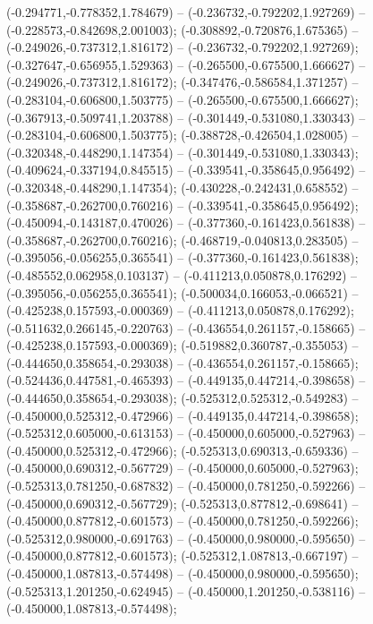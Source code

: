  (-0.294771,-0.778352,1.784679) -- (-0.236732,-0.792202,1.927269) -- (-0.228573,-0.842698,2.001003);
 (-0.308892,-0.720876,1.675365) -- (-0.249026,-0.737312,1.816172) -- (-0.236732,-0.792202,1.927269);
 (-0.327647,-0.656955,1.529363) -- (-0.265500,-0.675500,1.666627) -- (-0.249026,-0.737312,1.816172);
 (-0.347476,-0.586584,1.371257) -- (-0.283104,-0.606800,1.503775) -- (-0.265500,-0.675500,1.666627);
 (-0.367913,-0.509741,1.203788) -- (-0.301449,-0.531080,1.330343) -- (-0.283104,-0.606800,1.503775);
 (-0.388728,-0.426504,1.028005) -- (-0.320348,-0.448290,1.147354) -- (-0.301449,-0.531080,1.330343);
 (-0.409624,-0.337194,0.845515) -- (-0.339541,-0.358645,0.956492) -- (-0.320348,-0.448290,1.147354);
 (-0.430228,-0.242431,0.658552) -- (-0.358687,-0.262700,0.760216) -- (-0.339541,-0.358645,0.956492);
 (-0.450094,-0.143187,0.470026) -- (-0.377360,-0.161423,0.561838) -- (-0.358687,-0.262700,0.760216);
 (-0.468719,-0.040813,0.283505) -- (-0.395056,-0.056255,0.365541) -- (-0.377360,-0.161423,0.561838);
 (-0.485552,0.062958,0.103137) -- (-0.411213,0.050878,0.176292) -- (-0.395056,-0.056255,0.365541);
 (-0.500034,0.166053,-0.066521) -- (-0.425238,0.157593,-0.000369) -- (-0.411213,0.050878,0.176292);
 (-0.511632,0.266145,-0.220763) -- (-0.436554,0.261157,-0.158665) -- (-0.425238,0.157593,-0.000369);
 (-0.519882,0.360787,-0.355053) -- (-0.444650,0.358654,-0.293038) -- (-0.436554,0.261157,-0.158665);
 (-0.524436,0.447581,-0.465393) -- (-0.449135,0.447214,-0.398658) -- (-0.444650,0.358654,-0.293038);
 (-0.525312,0.525312,-0.549283) -- (-0.450000,0.525312,-0.472966) -- (-0.449135,0.447214,-0.398658);
 (-0.525312,0.605000,-0.613153) -- (-0.450000,0.605000,-0.527963) -- (-0.450000,0.525312,-0.472966);
 (-0.525313,0.690313,-0.659336) -- (-0.450000,0.690312,-0.567729) -- (-0.450000,0.605000,-0.527963);
 (-0.525313,0.781250,-0.687832) -- (-0.450000,0.781250,-0.592266) -- (-0.450000,0.690312,-0.567729);
 (-0.525313,0.877812,-0.698641) -- (-0.450000,0.877812,-0.601573) -- (-0.450000,0.781250,-0.592266);
 (-0.525312,0.980000,-0.691763) -- (-0.450000,0.980000,-0.595650) -- (-0.450000,0.877812,-0.601573);
 (-0.525312,1.087813,-0.667197) -- (-0.450000,1.087813,-0.574498) -- (-0.450000,0.980000,-0.595650);
 (-0.525313,1.201250,-0.624945) -- (-0.450000,1.201250,-0.538116) -- (-0.450000,1.087813,-0.574498);

